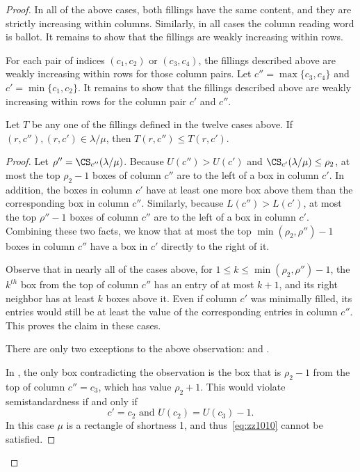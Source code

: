 \begin{proof}
In all of the above cases, both fillings have the same content, and they are strictly increasing within columns. Similarly, in all cases the column reading word is ballot. It remains to show that the fillings are weakly increasing within rows.

For each pair of indices $(c_1,c_2)$ or $(c_3,c_4)$, the fillings described above are weakly increasing within rows for those column pairs. Let $c'' = \max\{c_3,c_4\}$ and $c' = \min \{c_1,c_2\}$. It remains to show that the fillings described above are weakly increasing within rows for the column pair $c'$ and $c''$.

\begin{claim}
\label{claim:col2col3}
Let $T$ be any one of the fillings defined in the twelve cases above. If $(r,c''),(r,c')\in \lambda/\mu$, then $T(r,c'') \leq T(r,c')$.
\end{claim}

\begin{proof}
Let $\rho'' = \CS _{c''}(\lambda/\mu)$. Because $U(c'')>U(c')$ and $\CS _{c'}(\lambda/\mu)\leq \rho_2$, at most the top $\rho_2-1$ boxes of column $c''$ are to the left of a box in column $c'$. In addition, the boxes in column $c'$ have at least one more box above them than the corresponding box in column $c''$. Similarly, because $L(c'')>L(c')$, at most the top $\rho''-1$ boxes of column $c''$ are to the left of a box in column $c'$. Combining these two facts, we know that at most the top $\min(\rho_2,\rho'')-1$ boxes in column $c''$ have a box in $c'$ directly to the right of it.

Observe that in nearly all of the cases above, for $1\leq k\leq \min(\rho_2,\rho'')-1$, the $k^{th}$ box from the top of column $c''$ has an entry of at most $k+1$, and its right neighbor has at least $k$ boxes above it. Even if column $c'$ was minimally filled, its entries would still be at least the value of the corresponding entries in column $c''$. This proves the claim in these cases.

There are only two exceptions to the above observation:  and .

In , the only box contradicting the observation is the box that is $\rho_2-1$ from the top of column $c''=c_3$, which has value $\rho_2+1$. This would violate semistandardness if and only if
\begin{equation}
\label{eq:zz1010}
c'=c_2\text{ and }U(c_2) = U(c_3)-1.
\end{equation}
In this case $\mu$ is a rectangle of shortness 1, and thus~\eqref{eq:zz1010} cannot be satisfied.


\end{proof}
\end{proof}
